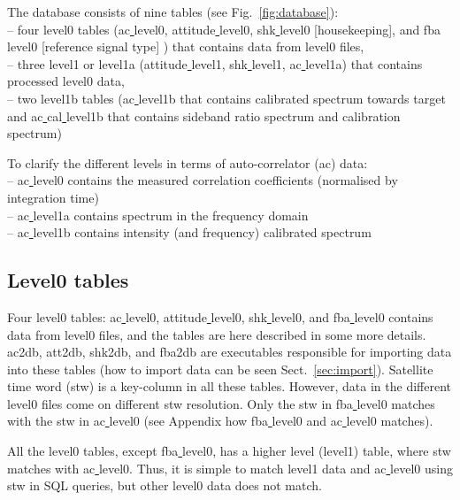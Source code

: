 \documentclass[12pt]{article}
\begin{document}
The database consists of nine tables (see Fig.~\ref{fig:database}):\\ 
-- four level0 tables (ac\underline{ }level0, attitude\underline{ }level0, 
shk\underline{ }level0 [housekeeping], and fba\underline{ }level0 
[reference signal type]
) that contains data from level0 files,\\
-- three level1 or level1a (attitude\underline{ }level1, shk\underline{ }level1,
ac\underline{ }level1a) that contains processed level0 data,\\ 
-- two level1b tables (ac\underline{ }level1b that contains calibrated 
spectrum towards target and
ac\underline{ }cal\underline{ }level1b that contains   
sideband ratio spectrum and calibration spectrum)

To clarify the different levels in terms of auto-correlator (ac) data:\\
-- ac\underline{ }level0 contains the measured correlation
coefficients (normalised by integration time)\\
-- ac\underline{ }level1a contains spectrum in the frequency domain\\
-- ac\underline{ }level1b contains intensity (and frequency) calibrated spectrum


\subsection{Level0 tables}
Four level0 tables: ac\underline{ }level0, attitude\underline{ }level0, 
shk\underline{ }level0, and fba\underline{ }level0 contains 
data from level0 files, and the tables are here described in 
some more details. 
ac2db, att2db, shk2db, and fba2db are executables responsible for importing
data into these tables (how to import data can be seen
Sect.~\ref{sec:import}).
Satellite time word (stw) is a key-column in all these tables.
However, data in the different level0 files come on different 
stw resolution. Only the stw in fba\underline{ }level0
matches with the stw in ac\underline{ }level0 (see Appendix
how fba\underline{ }level0 and ac\underline{ }level0 matches).
  
All the level0 tables, except fba\underline{ }level0, has a higher
level (level1) table, where stw matches with ac\underline{ }level0. 
Thus, it is simple to match level1 data and ac\underline{ }level0
using stw in SQL queries, but other level0 data does not match.


  
\end{document}
